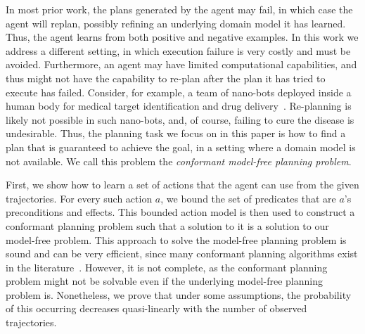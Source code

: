 \documentclass{article}
\newcommand{\MEMO}[1]
{ \fbox{
		\begin{minipage}[b]{7.9 cm}
			#1
		\end{minipage}
} }
\begin{document}
	
	In most prior work, the plans generated by the agent may fail, in which case the agent will replan, possibly refining an underlying domain model it has learned. Thus, the agent learns from both positive and negative examples. In this work we address a different setting, in which execution failure is very costly and must be avoided. Furthermore, an agent may have limited computational capabilities, and thus might not have the capability to re-plan after the plan it has tried to execute has failed. 
	Consider, for example, a team of nano-bots deployed inside a human body for medical target identification and drug delivery~\cite{cavalcanti2007nanorobot}. Re-planning is likely not possible in such nano-bots, and, of course, failing to cure the disease is undesirable. Thus, the planning task we focus on in this paper is how to find a plan that is guaranteed to achieve the goal, in a setting where a domain model is not available. We call this problem the {\em conformant model-free planning problem}. 
	
	
	First, we show how to learn a set of actions that the agent can use from the given trajectories. 
	For every such action $a$, we bound the set of predicates that are $a$'s preconditions and effects. This bounded action model is then used  to construct a conformant planning problem such that a solution to it is a solution to our model-free problem. This approach to solve the model-free planning problem 
	is sound and can be very efficient, since many conformant planning algorithms exist in the literature~\cite{palacios2009compiling,hoffmann2006conformant}. 
	However, it is not complete, as the conformant planning problem might not be solvable even if the underlying model-free planning problem is. Nonetheless, we prove that under some assumptions, the probability of this occurring decreases quasi-linearly with the number of observed trajectories. %
	
	
\end{document}
